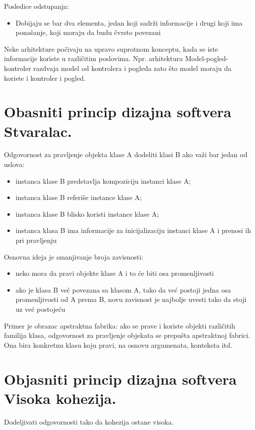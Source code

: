 \documentclass[a4paper]{article}
\begin{document}
Posledice odstupanja:
\begin{itemize}
   \item Dobijaju se bar dva elementa, jedan koji sadrži informacije i drugi koji ima ponašanje, koji moraju da budu čvrsto povezani\\
\end{itemize}
   
Neke arhitekture počivaju na upravo suprotnom konceptu, kada se iste informacije koriste u različitim poslovima. Npr. arhitektura Model-pogled-kontroler razdvaja model od kontrolera i pogleda zato što model moraju da koriste i kontroler i pogled.

\section{Obasniti princip dizajna softvera Stvaralac.}
Odgovornost za pravljenje objekta klase A dodeliti klasi B ako važi bar jedan od uslova:
\begin{itemize}
   \item instanca klase B predstavlja kompoziciju instanci klase A;
   \item instanca klase B referiše instance klase A;
   \item instanca klase B blisko koristi instance klase A;
   \item instanca klasa B ima informacije za inicijalizaciju instanci klase A i prenosi ih pri pravljenju
\end{itemize}
   
Osnovna ideja je smanjivanje broja zavisnosti:
\begin{itemize}
   \item neko mora da pravi objekte klase A i to će biti osa promenljivosti
   \item ako je klasa B već povezana sa klasom A, tako da već postoji jedna osa promenljivosti od A prema B, novu zavisnost je najbolje uvesti tako da stoji uz već postojeću\\
\end{itemize}
   
Primer je obrazac apstraktna fabrika: ako se prave i koriste objekti različitih familija klasa, odgovornost za pravljenje objekata se prepušta apstraktnoj fabrici. Ona bira konkretnu klasu koju pravi, na osnovu argumenata, konteksta itd.

\section{Objasniti princip dizajna softvera Visoka kohezija.}
Dodeljivati odgovornosti tako da kohezija ostane visoka.
\end{document}
